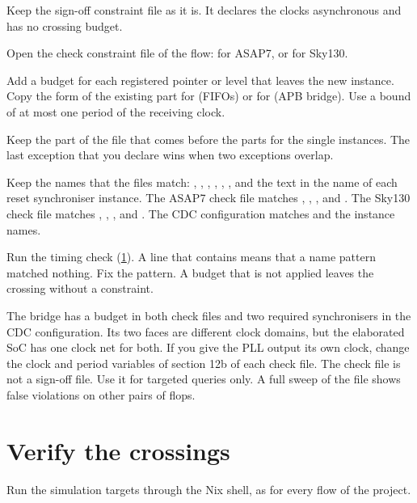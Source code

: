 \begin{procedure}
  \item Keep the sign-off constraint file as it is. It declares the clocks asynchronous and has no crossing budget.
  \item Open the check constraint file of the flow:  for ASAP7, or  for Sky130.
  \item Add a budget for each registered pointer or level that leaves the new instance. Copy the form of the existing part for  (FIFOs) or for  (APB bridge). Use a bound of at most one period of the receiving clock.
  \item Keep the part of the file that comes before the parts for the single instances. The last exception that you declare wins when two exceptions overlap.
  \item Keep the names that the files match: , , , , , , and the text  in the name of each reset synchroniser instance. The ASAP7 check file matches , , ,  and . The Sky130 check file matches , , ,  and . The CDC configuration matches  and the instance names.
  \item Run the timing check (\cref{um:ch:cdc-integration:verify}). A line that contains  means that a name pattern matched nothing. Fix the pattern. A budget that is not applied leaves the crossing without a constraint.
\end{procedure}
The bridge  has a budget in both check files and two required synchronisers in the CDC configuration. Its two faces are different clock domains, but the elaborated SoC has one clock net for both. If you give the PLL output its own clock, change the clock and period variables of section 12b of each check file. The check file is not a sign-off file. Use it for targeted queries only. A full sweep of the file shows false violations on other pairs of flops.

\section{Verify the crossings}\label{um:ch:cdc-integration:verify}
Run the simulation targets through the Nix shell, as for every flow of the project.

